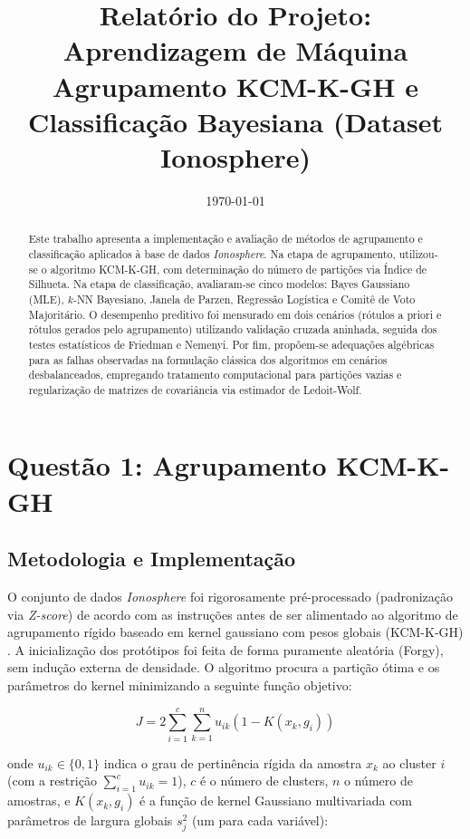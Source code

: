 \documentclass[12pt,a4paper]{article}
\title{\textbf{Relatório do Projeto: Aprendizagem de Máquina}\\ \large Agrupamento KCM-K-GH e Classificação Bayesiana (Dataset Ionosphere)}
\author{}
\date{\today}
\begin{document}
\maketitle

\begin{abstract}
Este trabalho apresenta a implementação e avaliação de métodos de agrupamento e classificação aplicados à base de dados \textit{Ionosphere}. Na etapa de agrupamento, utilizou-se o algoritmo KCM-K-GH, com determinação do número de partições via Índice de Silhueta. Na etapa de classificação, avaliaram-se cinco modelos: Bayes Gaussiano (MLE), $k$-NN Bayesiano, Janela de Parzen, Regressão Logística e Comitê de Voto Majoritário. O desempenho preditivo foi mensurado em dois cenários (rótulos a priori e rótulos gerados pelo agrupamento) utilizando validação cruzada aninhada, seguida dos testes estatísticos de Friedman e Nemenyi. Por fim, propõem-se adequações algébricas para as falhas observadas na formulação clássica dos algoritmos em cenários desbalanceados, empregando tratamento computacional para partições vazias e regularização de matrizes de covariância via estimador de Ledoit-Wolf.
\end{abstract}

\tableofcontents
\newpage

\section{Questão 1: Agrupamento KCM-K-GH}

\subsection{Metodologia e Implementação}
O conjunto de dados \textit{Ionosphere} \cite{ionosphere} foi rigorosamente pré-processado (padronização via \textit{Z-score}) de acordo com as instruções antes de ser alimentado ao algoritmo de agrupamento rígido baseado em kernel gaussiano com pesos globais (KCM-K-GH) \cite{kcm_k_gh}. A inicialização dos protótipos foi feita de forma puramente aleatória (Forgy), sem indução externa de densidade. O algoritmo procura a partição ótima e os parâmetros do kernel minimizando a seguinte função objetivo:

\begin{equation}
    J = 2 \sum_{i=1}^c \sum_{k=1}^n u_{ik} \left( 1 - K(x_k, g_i) \right)
\end{equation}

onde $u_{ik} \in \{0, 1\}$ indica o grau de pertinência rígida da amostra $x_k$ ao cluster $i$ (com a restrição $\sum_{i=1}^c u_{ik} = 1$), $c$ é o número de clusters, $n$ o número de amostras, e $K(x_k, g_i)$ é a função de kernel Gaussiano multivariada com parâmetros de largura globais $s_j^2$ (um para cada variável):
\end{document}
